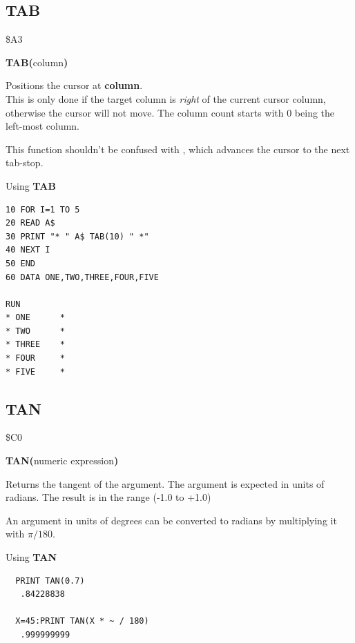 
\newpage
\subsection{TAB}
\begin{description}[leftmargin=2cm,style=nextline]
\item [Token:] \$A3
\item [Format:] {\bf TAB(}column{\bf)}
\item [Usage:] Positions the cursor at {\bf column}. \\
               This is only done if the target column is {\it right}
               of the current cursor column, otherwise the cursor
               will not move. The column count starts with 0 being the
               left-most column.

\item [Remarks:] This function shouldn't be confused with
               , which advances the cursor to the next
               tab-stop.

\item [Example:] Using {\bf TAB}
\begin{tcolorbox}[colback=black,coltext=white]
\verbatimfont{\codefont}
\begin{verbatim}
10 FOR I=1 TO 5
20 READ A$
30 PRINT "* " A$ TAB(10) " *"
40 NEXT I
50 END
60 DATA ONE,TWO,THREE,FOUR,FIVE

RUN
* ONE      *
* TWO      *
* THREE    *
* FOUR     *
* FIVE     *
\end{verbatim}
\end{tcolorbox}
\end{description}


\newpage
\subsection{TAN}
\begin{description}[leftmargin=2cm,style=nextline]
\item [Token:] \$C0
\item [Format:] {\bf TAN(}numeric expression{\bf)}
\item [Usage:] Returns the tangent of the
               argument.
               The argument is expected in units of radians.
               The result is in the range (-1.0 to +1.0)

\item [Remarks:] An argument in units of degrees
                 can be converted to radians
                 by multiplying it with $\pi/180$.
\item [Example:] Using {\bf TAN}
\begin{tcolorbox}[colback=black,coltext=white]
\verbatimfont{\codefont}
\begin{verbatim}
  PRINT TAN(0.7)
   .84228838

  X=45:PRINT TAN(X * ~ / 180)
   .999999999
\end{verbatim}
\end{tcolorbox}
\end{description}

